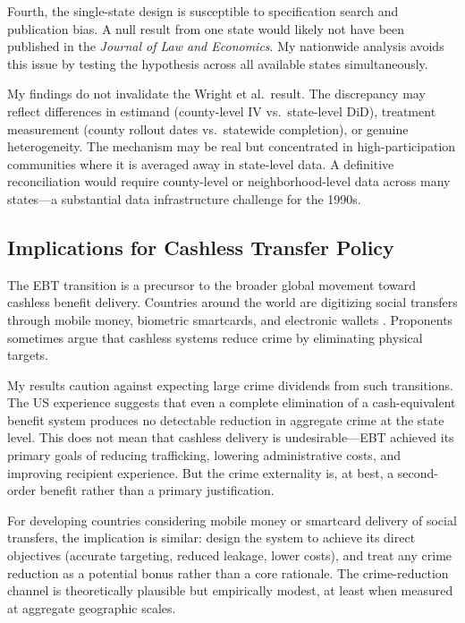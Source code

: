 \documentclass[12pt]{article}
\begin{document}
Fourth, the single-state design is susceptible to specification search and publication bias. A null result from one state would likely not have been published in the \textit{Journal of Law and Economics}. My nationwide analysis avoids this issue by testing the hypothesis across all available states simultaneously.

My findings do not invalidate the Wright et al.\ result. The discrepancy may reflect differences in estimand (county-level IV vs.\ state-level DiD), treatment measurement (county rollout dates vs.\ statewide completion), or genuine heterogeneity. The mechanism may be real but concentrated in high-participation communities where it is averaged away in state-level data. A definitive reconciliation would require county-level or neighborhood-level data across many states---a substantial data infrastructure challenge for the 1990s.

\subsection{Implications for Cashless Transfer Policy}

The EBT transition is a precursor to the broader global movement toward cashless benefit delivery. Countries around the world are digitizing social transfers through mobile money, biometric smartcards, and electronic wallets \citep{muralidharan2016building, dahl2014peer}. Proponents sometimes argue that cashless systems reduce crime by eliminating physical targets.

My results caution against expecting large crime dividends from such transitions. The US experience suggests that even a complete elimination of a cash-equivalent benefit system produces no detectable reduction in aggregate crime at the state level. This does not mean that cashless delivery is undesirable---EBT achieved its primary goals of reducing trafficking, lowering administrative costs, and improving recipient experience. But the crime externality is, at best, a second-order benefit rather than a primary justification.

For developing countries considering mobile money or smartcard delivery of social transfers, the implication is similar: design the system to achieve its direct objectives (accurate targeting, reduced leakage, lower costs), and treat any crime reduction as a potential bonus rather than a core rationale. The crime-reduction channel is theoretically plausible but empirically modest, at least when measured at aggregate geographic scales.
\end{document}
